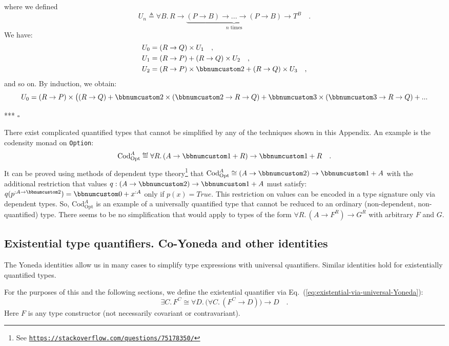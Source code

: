 where we defined 
\[
U_{n}\triangleq\forall B.\,R\rightarrow\underbrace{(P\rightarrow B)\rightarrow...\rightarrow(P\rightarrow B)}_{n\text{ times}}\rightarrow T^{B}\quad.
\]
We have:
\begin{align*}
 & U_{0}=(R\rightarrow Q)\times U_{1}\quad,\\
 & U_{1}=(R\rightarrow P)+(R\rightarrow Q)\times U_{2}\quad,\\
 & U_{2}=(R\rightarrow P)\times\bbnum 2+(R\rightarrow Q)\times U_{3}\quad,
\end{align*}
and so on. By induction, we obtain:
\[
U_{0}=(R\rightarrow P)\times\big((R\rightarrow Q)+\bbnum 2\times(\bbnum 2\rightarrow R\rightarrow Q)+\bbnum 3\times(\bbnum 3\rightarrow R\rightarrow Q)+...
\]

{*}{*}{*} $\square$

There exist complicated quantified types that cannot be simplified
by any of the techniques shown in this Appendix. An example is the
codensity monad on \lstinline!Option!:
\[
\text{Cod}_{\text{Opt}}^{A}\triangleq\forall R.\,(A\rightarrow\bbnum 1+R)\rightarrow\bbnum 1+R\quad.
\]
It can be proved using methods of dependent type theory\footnote{See \texttt{\href{https://stackoverflow.com/questions/75178350/}{https://stackoverflow.com/questions/75178350/}}}
that $\text{Cod}_{\text{Opt}}^{A}\cong(A\rightarrow\bbnum 2)\rightarrow\bbnum 1+A$
with the additional restriction that values $q:(A\rightarrow\bbnum 2)\rightarrow\bbnum 1+A$
must satisfy: $q(p^{:A\rightarrow\bbnum 2})=\bbnum 0+x^{:A}$ only
if $p(x)=True$. This restriction on values can be encoded in a type
signature only via dependent types. So, $\text{Cod}_{\text{Opt}}^{A}$
is an example of a universally quantified type that cannot be reduced
to an ordinary (non-dependent, non-quantified) type. There seems to
be no simplification that would apply to types of the form $\forall R.\,(A\rightarrow F^{R})\rightarrow G^{R}$
with arbitrary $F$ and $G$.

\subsection{Existential type quantifiers. Co-Yoneda and other identities}

The Yoneda identities allow us in many cases to simplify type expressions
with universal quantifiers. Similar identities hold for existentially
quantified types.

For the purposes of this and the following sections, we define the
existential quantifier via Eq.~(\ref{eq:existential-via-universal-Yoneda}):
\[
\exists C.\,F^{C}\cong\forall D.\,\big(\forall C.\,(F^{C}\rightarrow D)\big)\rightarrow D\quad.
\]
Here $F$ is any type constructor (not necessarily covariant or contravariant).

